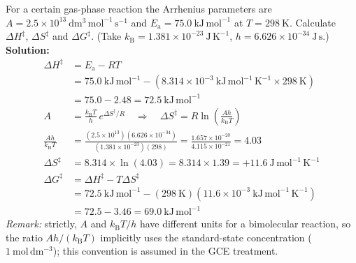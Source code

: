 \documentclass[11pt]{article}
\begin{document}
\begin{exoresolu}
For a certain gas-phase reaction the Arrhenius parameters are $A = 2.5\times10^{13}\ \mathrm{dm^3\,mol^{-1}\,s^{-1}}$ and $E_{\mathrm{a}} = 75.0\ \mathrm{kJ\,mol^{-1}}$ at $T = 298\ \mathrm{K}$. Calculate $\Delta H^{\ddagger}$, $\Delta S^{\ddagger}$ and $\Delta G^{\ddagger}$. (Take $k_{\mathrm{B}} = 1.381\times10^{-23}\ \mathrm{J\,K^{-1}}$, $h = 6.626\times10^{-34}\ \mathrm{J\,s}$.)
\tcblower
\textbf{Solution:}
\begin{align*}
\Delta H^{\ddagger} &= E_{\mathrm{a}} - RT \\
&= 75.0\ \mathrm{kJ\,mol^{-1}} - (8.314\times10^{-3}\ \mathrm{kJ\,mol^{-1}\,K^{-1}} \times 298\ \mathrm{K}) \\
&= 75.0 - 2.48 = \mathbf{72.5\ \mathrm{kJ\,mol^{-1}}} \\[4pt]
A &= \frac{k_{\mathrm{B}}T}{h}\, e^{\Delta S^{\ddagger}/R}
\quad\Rightarrow\quad
\Delta S^{\ddagger} = R \ln\!\left(\frac{A h}{k_{\mathrm{B}}T}\right) \\[2pt]
\frac{A h}{k_{\mathrm{B}}T} &= \frac{(2.5\times10^{13})(6.626\times10^{-34})}
{(1.381\times10^{-23})(298)}
= \frac{1.657\times10^{-20}}{4.115\times10^{-21}} = 4.03 \\[2pt]
\Delta S^{\ddagger} &= 8.314 \times \ln(4.03) = 8.314 \times 1.39 = \mathbf{+11.6\ \mathrm{J\,mol^{-1}\,K^{-1}}} \\[4pt]
\Delta G^{\ddagger} &= \Delta H^{\ddagger} - T\Delta S^{\ddagger} \\
&= 72.5\ \mathrm{kJ\,mol^{-1}} - (298\ \mathrm{K})(11.6\times10^{-3}\ \mathrm{kJ\,mol^{-1}\,K^{-1}}) \\
&= 72.5 - 3.46 = \mathbf{69.0\ \mathrm{kJ\,mol^{-1}}}
\end{align*}
\emph{Remark:} strictly, $A$ and $k_{\mathrm{B}}T/h$ have different units for a bimolecular reaction, so the ratio $Ah/(k_{\mathrm{B}}T)$ implicitly uses the standard-state concentration ($1\ \mathrm{mol\,dm^{-3}}$); this convention is assumed in the GCE treatment.
\end{exoresolu}
\end{document}
